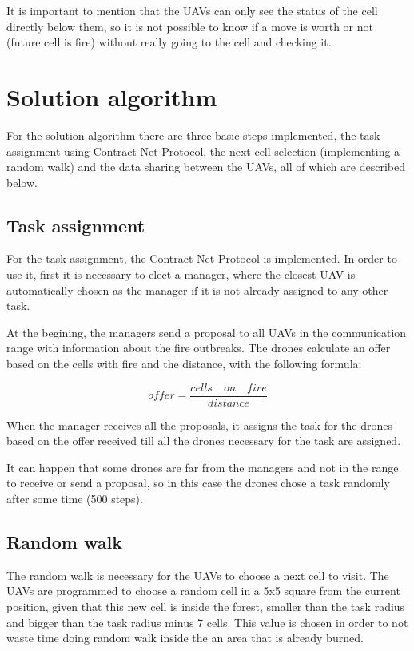 \documentclass{article}
\begin{document}
It is important to mention that the UAVs can only see the status of the cell directly below them, so it is not possible to know if a move is worth or not (future cell is fire) without really going to the cell and checking it.

\section{Solution algorithm}
For the solution algorithm there are three basic steps implemented, the task assignment using Contract Net Protocol, the next cell selection (implementing a random walk) and the data sharing between the UAVs, all of which are described below.

\subsection{Task assignment}
For the task assignment, the Contract Net Protocol is implemented. In order to use it, first it is necessary to elect a manager, where the closest UAV is automatically chosen as the manager if it is not already assigned to any other task.

At the begining, the managers send a proposal to all UAVs in the communication range with information about the fire outbreaks. The drones calculate an offer based on the cells with fire and the distance, with the following formula:

\[ offer = \dfrac{cells\quad on\quad fire}{distance} \]

When the manager receives all the proposals, it assigns the task for the drones based on the offer received till all the drones necessary for the task are assigned.

It can happen that some drones are far from the managers and not in the range to receive or send a proposal, so in this case the drones chose a task randomly after some time (500 steps).

\subsection{Random walk}
The random walk is necessary for the UAVs to choose a next cell to visit. The UAVs are programmed to choose a random cell in a 5x5 square from the current position, given that this new cell is inside the forest, smaller than the task radius and bigger than the task radius minus 7 cells. This value is chosen in order to not waste time doing random walk inside the an area that is already burned.
\end{document}
